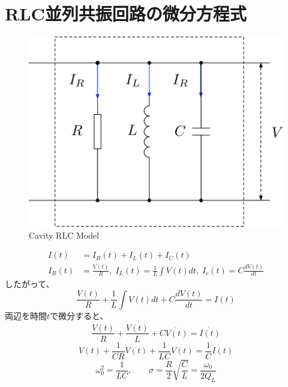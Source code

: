 \documentclass[book]{jlreq}
\begin{document}
\section{RLC並列共振回路の微分方程式}
%
\begin{figure}[hbt]
    \begin{center}
        \includegraphics[width=12cm,clip]{figs/RLC_Model.pdf}
        \caption{Cavity RLC Model}
        \label{fig:RLC}
    \end{center}
\end{figure}
%
\begin{equation}
    \begin{split}
        I(t) &= I_R(t) + I_L(t) + I_C(t) \\
        I_R(t) &= \frac{V(t)}{R}, \; I_L(t) = \frac{1}{L}\int V(t) dt, \; I_c(t) = C\frac{dV(t)}{dt}
    \end{split}
\end{equation}
%
したがって、
%
\begin{equation}
    \frac{V(t)}{R} + \frac{1}{L}\int V(t) dt + C\frac{dV(t)}{dt} = I(t)
\end{equation}
%
両辺を時間$t$で微分すると、
%
\begin{equation}
    \frac{\dot{V}(t)}{R} + \frac{V(t)}{L}+ C \ddot{V(t)} = \dot{I(t)}
\end{equation}
%
\begin{equation}
    \ddot{V}(t) + \frac{1}{CR}\dot{V}(t) + \frac{1}{LC} V(t) = \frac{1}{C}\dot{I}(t)
\end{equation}
%
\begin{equation}
    \omega_0^2 = \frac{1}{LC}, \qquad \sigma = \frac{R}{2}\sqrt{\frac{C}{L}} = \frac{\omega_0}{2Q_L}
\end{equation}
\end{document}
